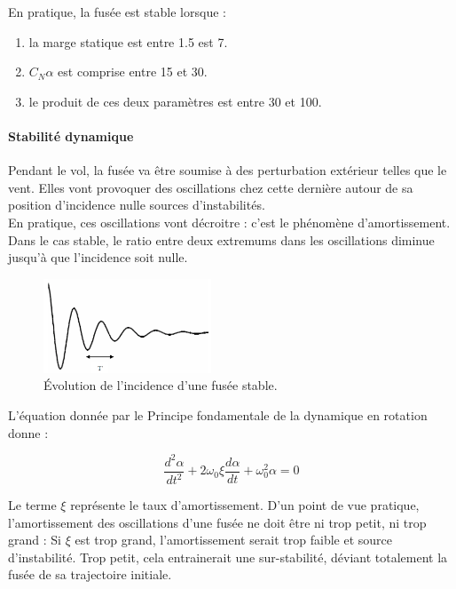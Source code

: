 \documentclass[a4paper]{article}
\begin{document}
En pratique, la fusée est stable lorsque :
\begin{enumerate}
\item la marge statique est entre 1.5 est 7.
\item  \textbf{$C_{N}\alpha$} est comprise entre 15 et 30.
\item le produit de ces deux paramètres est entre 30 et 100.
\end{enumerate}



\paragraph{Stabilité dynamique}

Pendant le vol, la fusée va être soumise à des perturbation extérieur telles que le vent. Elles vont provoquer des oscillations chez cette dernière autour de sa position d'incidence nulle sources d'instabilités.\\

En pratique, ces oscillations vont décroitre : c'est le phénomène d'amortissement. Dans le cas stable, le ratio entre deux extremums dans les oscillations diminue jusqu'à que l'incidence soit nulle.

\begin{figure}[!htbp]
\begin{center}
\includegraphics[width=5cm]{ammortissement.PNG} 
\end{center}
\caption{Évolution de l'incidence d'une fusée stable.}
\end{figure}

L'équation donnée par le Principe fondamentale de la dynamique en rotation donne : 

\begin{equation}
\frac{d^{2} \alpha}{dt^{2}} + 2\omega_{0} \xi  \frac{d \alpha}{dt} + \omega_{0}^{2}\alpha = 0
\end{equation}

Le terme $\xi$ représente le taux d'amortissement. D'un point de vue pratique, l'amortissement des oscillations d'une fusée ne doit être ni trop petit, ni trop grand : Si $\xi$ est trop grand, l'amortissement serait trop faible et source d'instabilité. Trop petit, cela entrainerait une sur-stabilité, déviant totalement la fusée de sa trajectoire initiale.\\
\end{document}
